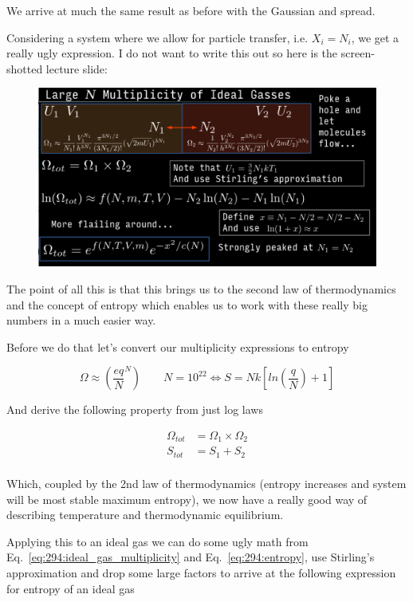 \documentclass[10pt]{article}
\begin{document}
We arrive at much the same result as before with the Gaussian and spread.


Considering a system where we allow for particle transfer, i.e. $ X_i = N_i $, we get a really ugly expression.
I do not want to write this out so here is the screen-shotted lecture slide:

\begin{figure}[H]
	\centering
	\includegraphics[width=0.8\linewidth]{img/294_large_n_n_transfer.png}
\end{figure}

The point of all this is that this brings us to the second law of thermodynamics and the concept of entropy which enables us to work with these really big numbers in a much easier way.


Before we do that let's convert our multiplicity expressions to entropy

\begin{equation}
	\Omega \approx (\frac{eq}{N}^N) \qquad N = 10^22 \Leftrightarrow
	S = Nk[ln(\frac{q}{N}) + 1]
	\label{eq:294:entropy_convert}
\end{equation}

And derive the following property from just log laws

\begin{equation}
	\begin{split}
		\Omega_{tot} &= \Omega_1 \times \Omega_2 \\
		 S_{tot}&= S_1 + S_2 \\
	\end{split}
	\label{eq:294:entropy_usage}
\end{equation}


Which, coupled by the 2nd law of thermodynamics (entropy increases and system will be most stable maximum entropy), we now have a really good way of describing temperature and thermodynamic equilibrium.

Applying this to an ideal gas we can do some ugly math from Eq.~\ref{eq:294:ideal_gas_multiplicity} and Eq.~\ref{eq:294:entropy}, use Stirling's approximation and drop some large factors to arrive at the following expression for entropy of an ideal gas
\end{document}
